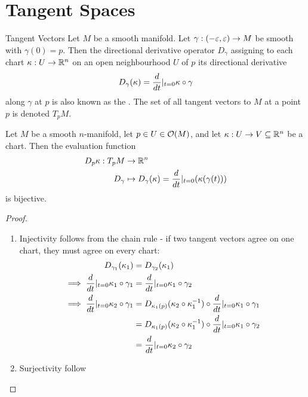 \section{Tangent Spaces}
\begin{importantdefinition}{Tangent Vectors}{}
	Let $M$ be a smooth manifold. Let $\gamma : (-\varepsilon, \varepsilon) \to M$ be smooth with $\gamma(0) = p$. Then the directional derivative operator $D_\gamma$ assigning to each chart $\kappa : U \to \mathbb{R}^n$ on an open neighbourhood $U$ of $p$ its directional derivative
	\begin{align*}
		D_\gamma(\kappa) = \frac{d}{dt}|_{t = 0} \kappa \circ \gamma
	\end{align*}
	along $\gamma$ at $p$ is also known as the . The set of all tangent vectors to $M$ at a point $p$ is denoted $T_pM$.
\end{importantdefinition}
\begin{theorem}
	Let $M$ be a smooth $n$-manifold, let $p \in U \in \mathcal{O}(M)$, and let $\kappa : U \to V \subseteq \mathbb{R}^n$ be a chart. Then the evaluation function
	\begin{align*}
		D_p \kappa : T_pM &\to \mathbb{R}^n\\
		D_\gamma &\mapsto D_\gamma(\kappa) = \frac{d}{dt}|_{t = 0} (\kappa(\gamma(t)))
	\end{align*}
	is bijective.
\end{theorem}
\begin{proof}
	\begin{enumerate}
		\item Injectivity follows from the chain rule - if two tangent vectors agree on one chart, they must agree on every chart:
		\begin{align*}
			D_{\gamma_1}(\kappa_1) &= D_{\gamma_2}(\kappa_1)\\
			\implies \frac{d}{dt}|_{t = 0} \kappa_1 \circ \gamma_1 &= \frac{d}{dt}|_{t = 0} \kappa_1 \circ \gamma_2\\
			\implies \frac{d}{dt}|_{t = 0} \kappa_2 \circ \gamma_1 
			&=  D_{\kappa_1(p)}(\kappa_2 \circ \kappa_1^{-1}) \circ \frac{d}{dt}|_{t = 0} \kappa_1 \circ \gamma_1\\
			&=  D_{\kappa_1(p)}(\kappa_2 \circ \kappa_1^{-1}) \circ \frac{d}{dt}|_{t = 0} \kappa_1 \circ \gamma_2\\
			&=  \frac{d}{dt}|_{t = 0} \kappa_2 \circ \gamma_2
		\end{align*}
		\item Surjectivity follow
	\end{enumerate}
\end{proof}